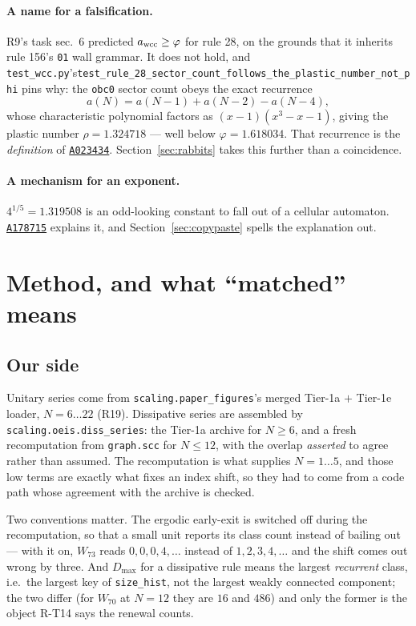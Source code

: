 \documentclass[11pt]{article}
\newcommand{\rt}[1]{\texttt{#1}}
\newcommand{\fn}[1]{\texttt{#1}}
\newcommand{\oeis}[1]{\href{https://oeis.org/#1}{\texttt{#1}}}
\theoremstyle{plain}
\begin{document}
\paragraph{A name for a falsification.} R9's task sec.~6 predicted
$a_{\rm wcc}\ge\varphi$ for rule 28, on the grounds that it inherits rule 156's
\rt{01} wall grammar. It does not hold, and \fn{test\_wcc.py}'s\linebreak[1]
\fn{test\_rule\_28\_sector\_count\_}\-\fn{follows\_the\_plastic\_number\_not\_phi}
pins why: the \rt{obc0} sector count obeys the exact recurrence
\[
a(N) = a(N-1) + a(N-2) - a(N-4),
\]
whose characteristic polynomial factors as $(x-1)(x^3-x-1)$, giving the plastic
number $\rho = 1.324718$ --- well below $\varphi=1.618034$. That recurrence is
the \emph{definition} of \oeis{A023434}. Section~\ref{sec:rabbits} takes this
further than a coincidence.

\paragraph{A mechanism for an exponent.} $4^{1/5}=1.319508$ is an odd-looking
constant to fall out of a cellular automaton. \oeis{A178715} explains it, and
Section~\ref{sec:copypaste} spells the explanation out.

\section{Method, and what ``matched'' means}

\subsection{Our side}

Unitary series come from \fn{scaling.paper\_figures}'s merged Tier-1a $+$
Tier-1e loader, $N=6\ldots22$ (R19). Dissipative series are assembled by
\fn{scaling.oeis.diss\_series}: the Tier-1a archive for $N\ge6$, and a fresh
recomputation from \fn{graph.scc} for $N\le12$, with the overlap
\emph{asserted} to agree rather than assumed. The recomputation is what supplies
$N=1\ldots5$, and those low terms are exactly what fixes an index shift, so they
had to come from a code path whose agreement with the archive is checked.

Two conventions matter. The ergodic early-exit is switched off during the
recomputation, so that a small unit reports its class count instead of bailing
out --- with it on, $W_{73}$ reads $0,0,0,4,\ldots$ instead of $1,2,3,4,\ldots$
and the shift comes out wrong by three. And $D_{\max}$ for a dissipative rule
means the largest \emph{recurrent} class, i.e.\ the largest key of
\rt{size\_hist}, not the largest weakly connected component; the two differ (for
$W_{70}$ at $N=12$ they are $16$ and $486$) and only the former is the object
R-T14 says the renewal counts.
\end{document}
